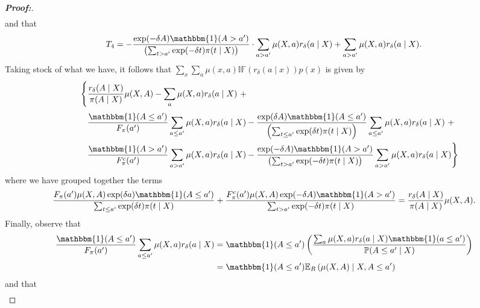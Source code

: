 \documentclass[11pt,twoside]{article}
\theoremstyle{definition}
\theoremstyle{remark}
\begin{document}
\begin{proof}[\textbf{Proof:}]
\begin{align*}
\end{align*}
and that
\begin{align*}
   T_4 = -\frac{ \text{exp}(- \delta A) \mathbbm{1}(A > a^{\prime}) }{\left(\sum_{t > a^{\prime}} \text{exp}(- \delta t) \pi(t \mid X) \right)} \cdot  \sum_{a > a^{\prime}} \mu(X, a) r_\delta(a \mid X)  +  \sum_{a > a^{\prime}} \mu(X, a) r_\delta(a \mid X).
\end{align*}
Taking stock of what we have, it follows that $\sum_x \sum_a \mu(x, a) \mathbb{IF}( r_\delta(a \mid x))  p(x)$ is given by
\begin{align*}
    &\phantom{{}={}}\Bigg\{\frac{r_\delta(A \mid X)}{\pi(A \mid X)} \mu(X, A) -  \sum_{a} \mu(X, a) r_\delta(a \mid X) \ + \\
    &\phantom{{}={\Bigg\{}}\frac{\mathbbm{1}(A \leq a^{\prime})}{F_{\pi}(a^{\prime})} \sum_{a \leq a^{\prime}} \mu(X, a) r_\delta(a \mid X) -\frac{ \text{exp}(\delta A) \mathbbm{1}(A \leq a^{\prime}) }{\left(\sum_{t \leq a^{\prime}} \text{exp}(\delta t) \pi(t \mid X) \right)} \sum_{a \leq a^{\prime}} \mu(X, a) r_\delta(a \mid X) \ + \\
      &\phantom{{}={\Bigg\{}} \frac{\mathbbm{1}(A > a^{\prime})}{F^c_{\pi}(a^{\prime})} \sum_{a > a^{\prime}} \mu(X, a) r_\delta(a \mid X) -\frac{ \text{exp}(- \delta A) \mathbbm{1}(A > a^{\prime}) }{\left(\sum_{t > a^{\prime}} \text{exp}(- \delta t) \pi(t \mid X) \right)}  \sum_{a > a^{\prime}} \mu(X, a) r_\delta(a \mid X) \Bigg\}
\end{align*}
where we have grouped together the terms
\begin{align*}
     \frac{F_\pi(a^{\prime})\mu(X, A) \exp(\delta a) \mathbbm{1}(A \leq a^{\prime})}{\sum_{t \leq a^{\prime}} \text{exp}(\delta t) \pi(t \mid X)} +  \frac{F^c_\pi(a^{\prime})\mu(X, A) \exp(- \delta A) \mathbbm{1}(A > a^{\prime})}{\sum_{t > a^{\prime}} \text{exp}(-\delta t) \pi(t \mid X)} = \frac{r_\delta(A \mid X)}{\pi(A \mid X)} \mu(X, A).
\end{align*}
Finally, observe that
\begin{align*}
    \frac{\mathbbm{1}(A \leq a^{\prime})}{F_{\pi}(a^{\prime})} \sum_{a \leq a^{\prime}} \mu(X, a) r_\delta(a \mid X) &= \mathbbm{1}(A \leq a^{\prime}) \left( \frac{\sum_{a} \mu(X, a) r_\delta(a \mid X) \mathbbm{1}(a \leq a^{\prime})}{\mathbb{P}(A \leq a^{\prime} \mid X)} \right) \\
    &= \mathbbm{1}(A \leq a^{\prime}) \mathbb{E}_R\left( \mu(X, A) \mid X, A \leq a^{\prime} \right)
\end{align*}
and that
\begin{align*}

\end{align*}
\end{proof}
\end{document}
